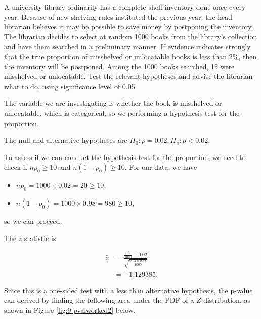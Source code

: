 \documentclass[
]{book}
\providecommand{\tightlist}{%
  \setlength{\itemsep}{0pt}\setlength{\parskip}{0pt}}
\begin{document}
A university library ordinarily has a complete shelf inventory done once every year. Because of new shelving rules instituted the previous year, the head librarian believes it may be possible to save money by postponing the inventory. The librarian decides to select at random 1000 books from the library's collection and have them searched in a preliminary manner. If evidence indicates strongly that the true proportion of misshelved or unlocatable books is less than 2\%, then the inventory will be postponed. Among the 1000 books searched, 15 were misshelved or unlocatable. Test the relevant hypotheses and advise the librarian what to do, using significance level of 0.05.

The variable we are investigating is whether the book is misshelved or unlocatable, which is categorical, so we performing a hypothesis test for the proportion.

The null and alternative hypotheses are \(H_0: p = 0.02, H_a: p < 0.02\).

To assess if we can conduct the hypothesis test for the proportion, we need to check if \(n p_0 \geq 10\) and \(n(1-p_0) \geq 10\). For our data, we have

\begin{itemize}
\tightlist
\item
  \(n p_0 = 1000 \times 0.02 = 20 \geq 10\),
\item
  \(n (1-p_0) = 1000 \times 0.98 = 980 \geq 10\),
\end{itemize}

so we can proceed.

The \(z\) statistic is

\[
\begin{split}
\hat{z} &= \frac{\frac{15}{1000} - 0.02}{\sqrt{\frac{0.02 \times 0.98}{1000}}} \\
        &= -1.129385.
\end{split}
\]

Since this is a one-sided test with a less than alternative hypothesis, the p-value can derived by finding the following area under the PDF of a \(Z\) distribution, as shown in Figure \ref{fig:9-pvalworked2} below.
\end{document}
